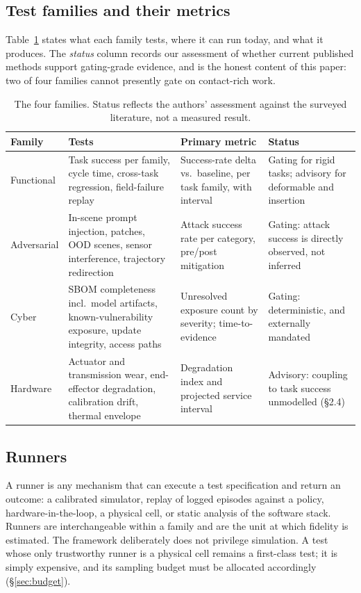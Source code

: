 \documentclass[11pt]{article}
\theoremstyle{definition}
\newcommand{\term}[1]{\emph{#1}}
\begin{document}
\subsection{Test families and their metrics}
\label{sec:families}

Table~\ref{tab:families} states what each family tests, where it can run today, and what it
produces. The \term{status} column records our assessment of whether current published
methods support gating-grade evidence, and is the honest content of this paper: two of four
families cannot presently gate on contact-rich work.

\begin{table}[t]
\small
\centering
\begin{tabularx}{\textwidth}{@{}l X l X@{}}
\toprule
\textbf{Family} & \textbf{Tests} & \textbf{Primary metric} & \textbf{Status} \\
\midrule
Functional & Task success per family, cycle time, cross-task regression, field-failure replay
  & Success-rate delta vs.\ baseline, per task family, with interval
  & Gating for rigid tasks; advisory for deformable and insertion \\
Adversarial & In-scene prompt injection, patches, OOD scenes, sensor interference, trajectory redirection
  & Attack success rate per category, pre/post mitigation
  & Gating: attack success is directly observed, not inferred \\
Cyber & SBOM completeness incl.\ model artifacts, known-vulnerability exposure, update integrity, access paths
  & Unresolved exposure count by severity; time-to-evidence
  & Gating: deterministic, and externally mandated \\
Hardware & Actuator and transmission wear, end-effector degradation, calibration drift, thermal envelope
  & Degradation index and projected service interval
  & Advisory: coupling to task success unmodelled (\S2.4) \\
\bottomrule
\end{tabularx}
\caption{The four families. Status reflects the authors' assessment against the surveyed
literature, not a measured result.}
\label{tab:families}
\end{table}

\subsection{Runners}

A runner is any mechanism that can execute a test specification and return an outcome: a
calibrated simulator, replay of logged episodes against a policy, hardware-in-the-loop, a
physical cell, or static analysis of the software stack. Runners are interchangeable within a
family and are the unit at which fidelity is estimated. The framework deliberately does not
privilege simulation. A test whose only trustworthy runner is a physical cell remains a
first-class test; it is simply expensive, and its sampling budget must be allocated
accordingly (\S\ref{sec:budget}).
\end{document}
